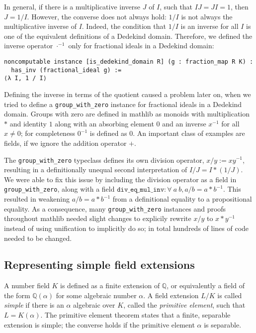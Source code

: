 \documentclass[a4paper,USenglish,cleveref, autoref, thm-restate]{lipics-v2021}
\newcommand{\lean}[1]{\texttt{#1}\xspace} %
\newcommand{\mathlib}{\textsf{mathlib}\xspace}
\newcommand{\Q}{\mathbb{Q}}
\begin{document}
In general, if there is a multiplicative inverse $J$ of $I$, such that $I J = J I = 1$, then $J = 1 / I$.
However, the converse does not always hold: $1 / I$ is not always the multiplicative inverse of $I$.
Indeed, the condition that $1 / I$ is an inverse for all $I$ is one of the equivalent definitions of a Dedekind domain.
Therefore, we defined the inverse operator $\cdot^{-1}$ only for fractional ideals in a Dedekind domain:
\begin{lstlisting}
noncomputable instance [is_dedekind_domain R] (g : fraction_map R K) :
  has_inv (fractional_ideal g) :=
⟨λ I, 1 / I⟩
\end{lstlisting}

Defining the inverse in terms of the quotient caused a problem later on, when we tried to define a \lean{group\_with\_zero} instance for fractional ideals in a Dedekind domain.
Groups with zero are defined in \mathlib as monoids with multiplication $*$ and identity $1$ along with an absorbing element $0$ and an inverse $x^{-1}$ for all $x \ne 0$; for completeness $0^{-1}$ is defined as $0$.
An important class of examples are fields, if we ignore the addition operator $+$.

The \lean{group\_with\_zero} typeclass defines its own division operator, $x / y := x y^{-1}$,
resulting in a definitionally unequal second interpretation of $I / J = I * (1 / J)$.
We were able to fix this issue by including the division operator as a field in \lean{group\_with\_zero},
along with a field $\lean{div\_eq\_mul\_inv} : \forall\ a\ b, a / b = a * b^{-1}$.
This resulted in weakening $a / b = a * b^{-1}$ from a definitional equality to a propositional equality.
As a consequence, many \lean{group\_with\_zero} instances and proofs throughout \mathlib needed slight changes to explicily rewrite $x / y$ to $x * y^{-1}$ instead of using unification to implicitly do so; in total hundreds of lines of code needed to be changed.

\subsection{Representing simple field extensions} \label{sec:simple-field-extension}

A number field $K$ is defined as a finite extension of $\Q$, or equivalently a field of the form $\Q(\alpha)$ for some algebraic number $\alpha$.
A field extension $L / K$ is called \emph{simple} if there is an $\alpha$ algebraic over $K$, called the \emph{primitive element}, such that $L = K(\alpha)$.
The primitive element theorem states that a finite, separable extension is simple; the converse holds if the primitive element $\alpha$ is separable.
\end{document}
